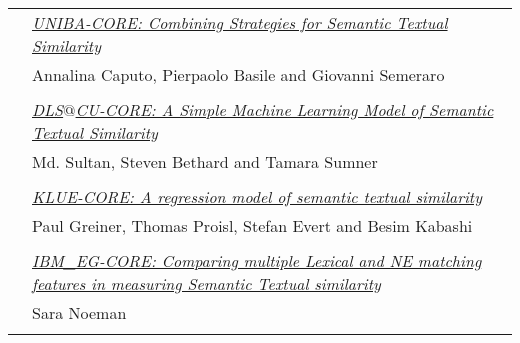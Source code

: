 \begin{tabular}{p{20mm}p{138mm}}
 & \hyperlink{page.170}{\em UNIBA-CORE: Combining Strategies for Semantic Textual Similarity}\\
         & Annalina Caputo, Pierpaolo Basile and Giovanni Semeraro \\
\\

 & \hyperlink{page.177}{\em DLS$@$CU-CORE: A Simple Machine Learning Model of Semantic Textual Similarity}\\
         & Md. Sultan, Steven Bethard and Tamara Sumner \\
\\

 & \hyperlink{page.182}{\em KLUE-CORE: A regression model of semantic textual similarity}\\
         & Paul Greiner, Thomas Proisl, Stefan Evert and Besim Kabashi \\
\\

 & \hyperlink{page.188}{\em IBM\_EG-CORE: Comparing multiple Lexical and NE matching features in measuring Semantic Textual similarity}\\
         & Sara Noeman \\
\\

\end{tabular}
\newpage

